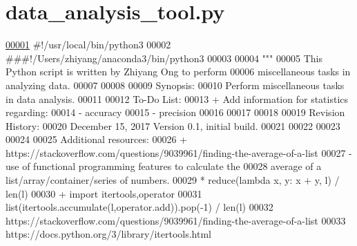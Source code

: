 \hypertarget{data__analysis__tool_8py_source}{}\section{data\+\_\+analysis\+\_\+tool.\+py}
\label{data__analysis__tool_8py_source}

\begin{DoxyCode}
\hypertarget{data__analysis__tool_8py_source_l00001}{}\hyperlink{namespacestatistics_1_1data__analysis__tool}{00001} \textcolor{comment}{#!/usr/local/bin/python3}
00002 \textcolor{comment}{###!/Users/zhiyang/anaconda3/bin/python3}
00003 
00004 \textcolor{stringliteral}{"""}
00005 \textcolor{stringliteral}{    This Python script is written by Zhiyang Ong to perform}
00006 \textcolor{stringliteral}{        miscellaneous tasks in analyzing data.}
00007 \textcolor{stringliteral}{}
00008 \textcolor{stringliteral}{}
00009 \textcolor{stringliteral}{    Synopsis:}
00010 \textcolor{stringliteral}{    Perform miscellaneous tasks in data analysis.}
00011 \textcolor{stringliteral}{}
00012 \textcolor{stringliteral}{    To-Do List:}
00013 \textcolor{stringliteral}{    + Add information for statistics regarding:}
00014 \textcolor{stringliteral}{        - accuracy}
00015 \textcolor{stringliteral}{        - precision}
00016 \textcolor{stringliteral}{}
00017 \textcolor{stringliteral}{}
00018 \textcolor{stringliteral}{}
00019 \textcolor{stringliteral}{    Revision History:}
00020 \textcolor{stringliteral}{    December 15, 2017           Version 0.1, initial build.}
00021 \textcolor{stringliteral}{}
00022 \textcolor{stringliteral}{}
00023 \textcolor{stringliteral}{}
00024 \textcolor{stringliteral}{}
00025 \textcolor{stringliteral}{    Additional resources:}
00026 \textcolor{stringliteral}{    + https://stackoverflow.com/questions/9039961/finding-the-average-of-a-list}
00027 \textcolor{stringliteral}{        - use of functional programming features to calculate the}
00028 \textcolor{stringliteral}{            average of a list/array/container/series of numbers.}
00029 \textcolor{stringliteral}{            * reduce(lambda x, y: x + y, l) / len(l)}
00030 \textcolor{stringliteral}{    + import itertools,operator}
00031 \textcolor{stringliteral}{        list(itertools.accumulate(l,operator.add)).pop(-1) / len(l)}
00032 \textcolor{stringliteral}{        https://stackoverflow.com/questions/9039961/finding-the-average-of-a-list}
00033 \textcolor{stringliteral}{        https://docs.python.org/3/library/itertools.html}

\end{DoxyCode}
